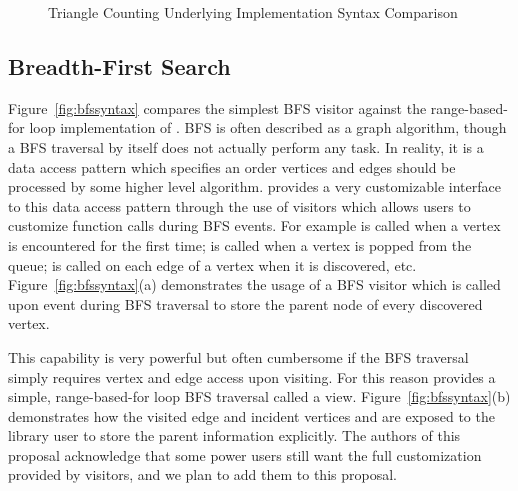 \begin{figure}[ht]
\noindent\begin{minipage}{.492\textwidth}
\subcaptionbox{ \bgl }
{\small
      
}
\end{minipage}\hfill
\begin{minipage}{.492\textwidth}
\subcaptionbox{ \stdgraph }
{\small
      
}
\end{minipage}
\caption{Triangle Counting Underlying Implementation Syntax Comparison}
\label{fig:tclowsyntax}
\end{figure}

\subsection{Breadth-First Search}
Figure~\ref{fig:bfssyntax} compares the simplest \bgl
BFS visitor against the range-based-for loop implementation of \stdgraph.
BFS is often described as a graph algorithm, though a BFS traversal
by itself does not actually perform any task.
In reality, it is a data access pattern which specifies an order
vertices and edges should be processed by some higher level algorithm.
\bgl provides a very customizable interface to this
data access pattern through the use of visitors which allows users
to customize function calls during BFS events.
For example  is called when a vertex is encountered for the
first time;  is called when a vertex is popped from the queue;
 is called on each edge of a vertex when it is discovered, etc.
Figure~\ref{fig:bfssyntax}(a) demonstrates the usage of a BFS visitor
 which is called upon event 
during BFS traversal to store the parent node of every discovered vertex.

This capability is very powerful but often cumbersome if the BFS traversal
simply requires vertex and edge access upon visiting.
For this reason \stdgraph provides a simple, range-based-for loop BFS traversal
called a view.
Figure~\ref{fig:bfssyntax}(b) demonstrates how the visited edge  and incident vertices  and  are exposed to the library user to store the parent information explicitly.
The authors of this proposal acknowledge that some power users still want
the full customization provided by visitors,
and we plan to add them to this proposal.

